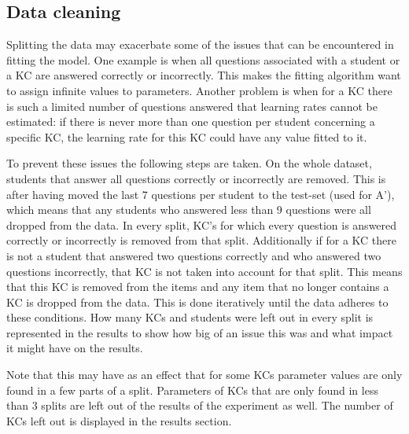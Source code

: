 \documentclass{scrartcl}
\begin{document}
\subsection{Data cleaning}
\label{sec:cleaning}
Splitting the data may exacerbate some of the issues that can be encountered in fitting the model. One example is when all questions associated with a student or a KC are answered correctly or incorrectly. This makes the fitting algorithm want to assign infinite values to parameters. Another problem is when for a KC there is such a limited number of questions answered that learning rates cannot be estimated: if there is never more than one question per student concerning a specific KC, the learning rate for this KC could have any value fitted to it.

To prevent these issues the following steps are taken. On the whole dataset, students that answer all questions correctly or incorrectly are removed. This is after having moved the last 7 questions per student to the test-set (used for A'), which means that any students who answered less than 9 questions were all dropped from the data. 
In every split, KC's for which every question is answered correctly or incorrectly is removed from that split. Additionally if for a KC there is not a student that  answered two questions correctly and who answered two questions incorrectly, that KC is not taken into account for that split. This means that this KC is removed from the items and any item that no longer contains a KC is dropped from the data. This is done iteratively until the data adheres to these conditions. How many KCs and students were left out in every split is represented in the results to show how big of an issue this was and what impact it might have on the results.

Note that this may have as an effect that for some KCs parameter values are only found in a few parts of a split. Parameters of KCs that are only found in less than 3 splits are left out of the results of the experiment as well. The number of KCs left out is displayed in the results section.
\end{document}
